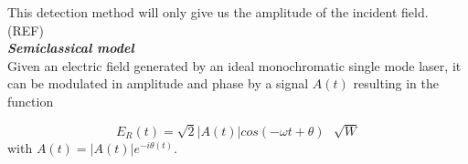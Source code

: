 \begin{bibunit}[plain]
This detection method will only give us the amplitude of the incident field. (REF)\\





\noindent
{\bf \em Semiclassical model}\\
%
%
Given an electric field generated by an ideal monochromatic single mode laser, it can be modulated in amplitude and phase by a signal $A(t)$ resulting in the function

\begin{equation}
    E_R(t)=\sqrt{2} |A(t)| cos\left(-\omega t + \theta\right) \,\,\,\, \sqrt{W}
\end{equation}
with $A(t)=|A(t)|e^{-i\theta(t)}$.


\end{bibunit}
